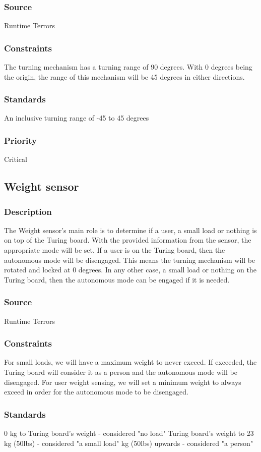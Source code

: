 \subsubsection{Source}
Runtime Terrors
\subsubsection{Constraints}
The turning mechanism has a turning range of 90 degrees. With 0 degrees being the origin, the range of this mechanism will be 45 degrees in either directions.
\subsubsection{Standards}
An inclusive turning range of -45 to 45 degrees
\subsubsection{Priority}
Critical

\subsection{Weight sensor}
\subsubsection{Description}
The Weight sensor's main role is to determine if a user, a small load or nothing is on top of the Turing board. With the provided information from the sensor, the appropriate mode will be set. If a user is on the Turing board, then the autonomous mode will be disengaged. This means the turning mechanism will be rotated and locked at 0 degrees. In any other case, a small load or nothing on the Turing board, then the autonomous mode can be engaged if it is needed. 
\subsubsection{Source}
Runtime Terrors
\subsubsection{Constraints}
For small loads, we will have a maximum weight to never exceed. If exceeded, the Turing board will consider it as a person and the autonomous mode will be disengaged. \hfill \break
For user weight sensing, we will set a minimum weight to always exceed in order for the autonomous mode to be disengaged.
\subsubsection{Standards}
0 kg to Turing board's weight - considered "no load" \hfill \break
Turing board's weight to 23 kg (50lbs) - considered "a small load" \hfill {} kg (50lbs) upwards - considered "a person"
